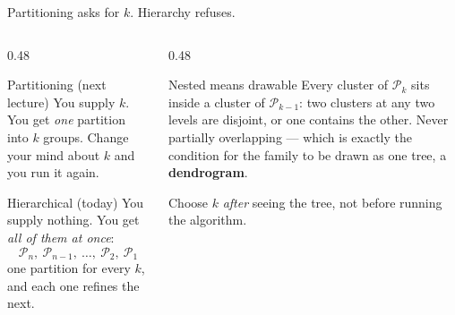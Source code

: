 \documentclass[aspectratio=169]{beamer}
\begin{document}
\begin{frame}[shrink=16]{Partitioning asks for $k$. Hierarchy refuses.}
  \begin{columns}[T]
    \begin{column}{0.48\textwidth}
      \begin{block}{Partitioning (next lecture)}
        You supply $k$. You get \emph{one} partition into $k$ groups. Change
        your mind about $k$ and you run it again.
      \end{block}
      \begin{exampleblock}{Hierarchical (today)}
        You supply nothing. You get \emph{all of them at once}:
        \[
          \mathcal{P}_n,\ \mathcal{P}_{n-1},\ \ldots,\ \mathcal{P}_2,\
          \mathcal{P}_1
        \]
        one partition for every $k$, and each one refines the next.
      \end{exampleblock}
    \end{column}
    \begin{column}{0.48\textwidth}
      \begin{block}{Nested means drawable}
        Every cluster of $\mathcal{P}_k$ sits inside a cluster of
        $\mathcal{P}_{k-1}$: two clusters at any two levels are disjoint, or
        one contains the other. Never partially overlapping --- which is
        exactly the condition for the family to be drawn as one tree, a
        \textbf{dendrogram}.
      \end{block}
      \begin{alertblock}{}
        \centering
        Choose $k$ \emph{after} seeing the tree, not before running the
        algorithm.
      \end{alertblock}
    \end{column}
  \end{columns}
\end{frame}
\end{document}

